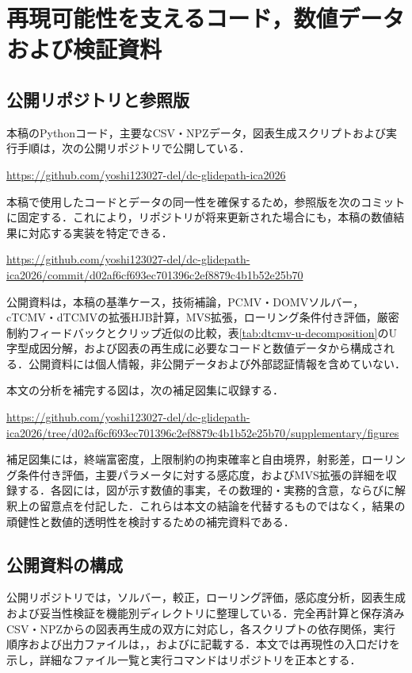 \documentclass[10pt,a4paper]{article}
\theoremstyle{plain}
\theoremstyle{definition}
\begin{document}
\appendix
\renewcommand{\thesection}{付録\Alph{section}}
\section{再現可能性を支えるコード，数値データおよび検証資料}
\label{app:reproducibility}

\subsection{公開リポジトリと参照版}

本稿のPythonコード，主要なCSV・NPZデータ，図表生成スクリプトおよび実行手順は，次の公開リポジトリで公開している．
\begin{center}
\url{https://github.com/yoshi123027-del/dc-glidepath-ica2026}
\end{center}
本稿で使用したコードとデータの同一性を確保するため，参照版を次のコミットに固定する．これにより，リポジトリが将来更新された場合にも，本稿の数値結果に対応する実装を特定できる．
\begin{center}
\url{https://github.com/yoshi123027-del/dc-glidepath-ica2026/commit/d02af6cf693ec701396c2ef8879c4b1b52e25b70}
\end{center}
公開資料は，本稿の基準ケース，技術補論，PCMV・DOMVソルバー，cTCMV・dTCMVの拡張HJB計算，MVS拡張，ローリング条件付き評価，厳密制約フィードバックとクリップ近似の比較，表\ref{tab:dtcmv-u-decomposition}のU字型成因分解，および図表の再生成に必要なコードと数値データから構成される．公開資料には個人情報，非公開データおよび外部認証情報を含めていない．

本文の分析を補完する図は，次の補足図集に収録する．
\begin{center}
\url{https://github.com/yoshi123027-del/dc-glidepath-ica2026/tree/d02af6cf693ec701396c2ef8879c4b1b52e25b70/supplementary/figures}
\end{center}
補足図集には，終端富密度，上限制約の拘束確率と自由境界，射影差，ローリング条件付き評価，主要パラメータに対する感応度，およびMVS拡張の詳細を収録する．各図には，図が示す数値的事実，その数理的・実務的含意，ならびに解釈上の留意点を付記した．これらは本文の結論を代替するものではなく，結果の頑健性と数値的透明性を検討するための補完資料である．

\subsection{公開資料の構成}
公開リポジトリでは，ソルバー，較正，ローリング評価，感応度分析，図表生成および妥当性検証を機能別ディレクトリに整理している．完全再計算と保存済みCSV・NPZからの図表再生成の双方に対応し，各スクリプトの依存関係，実行順序および出力ファイルは，，およびに記載する．本文では再現性の入口だけを示し，詳細なファイル一覧と実行コマンドはリポジトリを正本とする．
\end{document}
